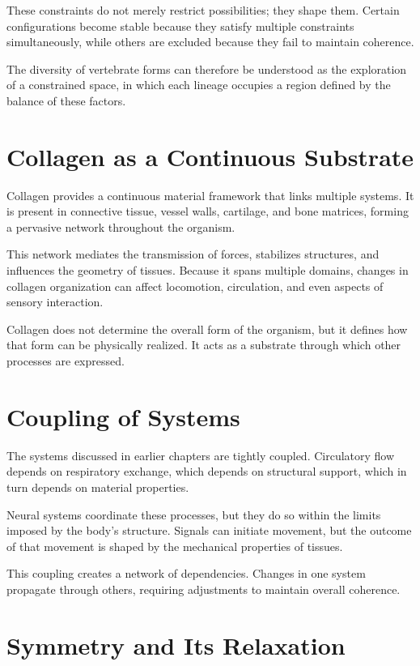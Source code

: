 \documentclass[11pt,oneside]{book}
\begin{document}
These constraints do not merely restrict possibilities; they shape them. Certain configurations become stable because they satisfy multiple constraints simultaneously, while others are excluded because they fail to maintain coherence.

The diversity of vertebrate forms can therefore be understood as the exploration of a constrained space, in which each lineage occupies a region defined by the balance of these factors.

\section{Collagen as a Continuous Substrate}

Collagen provides a continuous material framework that links multiple systems. It is present in connective tissue, vessel walls, cartilage, and bone matrices, forming a pervasive network throughout the organism.

This network mediates the transmission of forces, stabilizes structures, and influences the geometry of tissues. Because it spans multiple domains, changes in collagen organization can affect locomotion, circulation, and even aspects of sensory interaction.

Collagen does not determine the overall form of the organism, but it defines how that form can be physically realized. It acts as a substrate through which other processes are expressed.

\section{Coupling of Systems}

The systems discussed in earlier chapters are tightly coupled. Circulatory flow depends on respiratory exchange, which depends on structural support, which in turn depends on material properties.

Neural systems coordinate these processes, but they do so within the limits imposed by the body’s structure. Signals can initiate movement, but the outcome of that movement is shaped by the mechanical properties of tissues.

This coupling creates a network of dependencies. Changes in one system propagate through others, requiring adjustments to maintain overall coherence.

\section{Symmetry and Its Relaxation}
\end{document}
